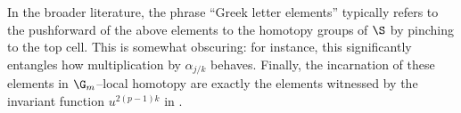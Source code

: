 \begin{remark}\label{GreekLetterElements}
In the broader literature, the phrase ``Greek letter elements'' typically refers to the pushforward of the above elements to the homotopy groups of $\S$ by pinching to the top cell.  This is somewhat obscuring: for instance, this significantly entangles how multiplication by $\alpha_{j/k}$ behaves.  Finally, the incarnation of these elements in $\G_m$--local homotopy are exactly the elements witnessed by the invariant function $u^{2(p-1)k}$ in .
\end{remark}










